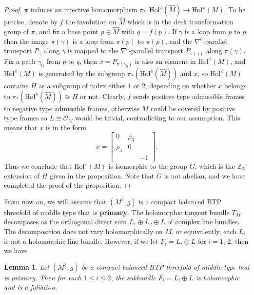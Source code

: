 \documentclass{amsart}
\numberwithin{equation}{section}
\newtheorem{lemma}  [theorem]     {Lemma}
\theoremstyle{definition}
\renewcommand{\1}{\mathds{1}}
\renewcommand{\>}{\rightarrow}
\begin{document}
\begin{proof}
$\pi$ induces an injective homomorphism  $\pi_{\ast}: \mbox{Hol}^{\,b}(\hat{M}) \rightarrow \mbox{Hol}^{\,b}(M)$. To be precise, denote by $f$ the involution on $\hat{M}$ which is in the deck transformation group of $\pi$, and fix a base point $p\in \hat{M}$ with $q=f(p)$. If $\gamma$ is a loop from $p$ to $p$, then the image $\pi (\gamma)$ is a loop from $\pi (p)$ to $\pi (p)$, and the $\nabla^b$-parallel transport $P_{\gamma}$ along $\gamma$ is mapped to the $\nabla^b$-parallel transport $P_{\pi (\gamma )}$ along $\pi (\gamma)$. Fix a path $\gamma_0$ from $p$ to $q$, then $x=P_{\pi (\gamma_0)}$ is also an element in $\mbox{Hol}^{\,b}(M)$, and $\mbox{Hol}^{\,b}(M)$ is generated by the subgroup $\pi_{\ast}(\mbox{Hol}^{\,b}(\hat{M}))$ and $x$, so  $\mbox{Hol}^{\,b}(M)$ contains $H$ as a subgroup of index either $1$ or $2$, depending on whether $x$ belongs to $\pi_{\ast}(\mbox{Hol}^{\,b}(\hat{M}))\cong H$ or not. Clearly, $f$ sends positive type admissible frames to negative type admissible frames, otherwise $M$ could be covered by positive type frames so $L\cong {\mathcal O}_{\!M}$ would be trivial, contradicting to our assumption. This means that $x$ is in the form
$$ x = \left[ \begin{array}{ccc} 0 & \rho_3 & \\ \rho_4 & 0 & \\ & & -1 \end{array}\right] . $$
Thus we conclude that $\mbox{Hol}^{\,b}(M)$ is isomorphic to the group $G$, which is the ${\mathbb Z}_2$-extension of $H$ given in the proposition. Note that $G$ is not abelian, and we have completed the proof of the proposition.
\end{proof}

From now on, we will assume that $(M^3,g)$ is a compact balanced BTP threefold of middle type that is {\bf primary}. The holomorphic tangent bundle $T_{\!M}$ decomposes as the orthogonal direct sum $L_1 \oplus L_2 \oplus L$ of complex line bundles. The decomposition does not vary holomorphically on $M$, or equivalently, each $L_i$ is not a holomorphic line bundle. However, if we let $F_i=L_i\oplus L$ for $i=1$, $2$, then we have

\begin{lemma} \label{claim9.5b}
Let $(M^3,g)$ be a compact balanced BTP threefold of middle type that is primary. Then for each $1\leq i\leq 2$, the subbundle $F_i=L_i\oplus L$ is holomorphic and is a foliation.
\end{lemma}
\end{document}
